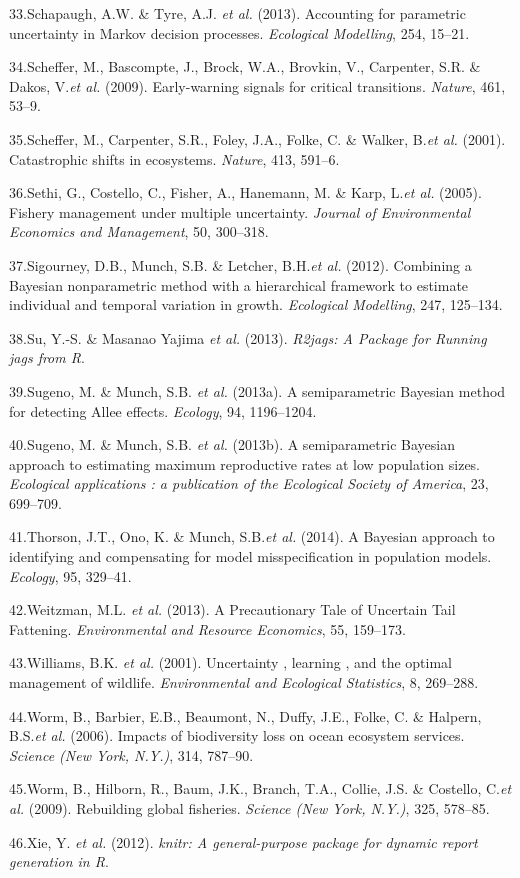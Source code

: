 \documentclass[author-year, 12pt,review]{elsarticle} %
\begin{document}
33.Schapaugh, A.W. \& Tyre, A.J. \emph{et al.} (2013). Accounting for
parametric uncertainty in Markov decision processes. \emph{Ecological
Modelling}, 254, 15--21.

34.Scheffer, M., Bascompte, J., Brock, W.A., Brovkin, V., Carpenter,
S.R. \& Dakos, V.\emph{et al.} (2009). Early-warning signals for
critical transitions. \emph{Nature}, 461, 53--9.

35.Scheffer, M., Carpenter, S.R., Foley, J.A., Folke, C. \& Walker,
B.\emph{et al.} (2001). Catastrophic shifts in ecosystems.
\emph{Nature}, 413, 591--6.

36.Sethi, G., Costello, C., Fisher, A., Hanemann, M. \& Karp, L.\emph{et
al.} (2005). Fishery management under multiple uncertainty.
\emph{Journal of Environmental Economics and Management}, 50, 300--318.

37.Sigourney, D.B., Munch, S.B. \& Letcher, B.H.\emph{et al.} (2012).
Combining a Bayesian nonparametric method with a hierarchical framework
to estimate individual and temporal variation in growth.
\emph{Ecological Modelling}, 247, 125--134.

38.Su, Y.-S. \& Masanao Yajima \emph{et al.} (2013). \emph{R2jags: A
Package for Running jags from R}.

39.Sugeno, M. \& Munch, S.B. \emph{et al.} (2013a). A semiparametric
Bayesian method for detecting Allee effects. \emph{Ecology}, 94,
1196--1204.

40.Sugeno, M. \& Munch, S.B. \emph{et al.} (2013b). A semiparametric
Bayesian approach to estimating maximum reproductive rates at low
population sizes. \emph{Ecological applications : a publication of the
Ecological Society of America}, 23, 699--709.

41.Thorson, J.T., Ono, K. \& Munch, S.B.\emph{et al.} (2014). A Bayesian
approach to identifying and compensating for model misspecification in
population models. \emph{Ecology}, 95, 329--41.

42.Weitzman, M.L. \emph{et al.} (2013). A Precautionary Tale of
Uncertain Tail Fattening. \emph{Environmental and Resource Economics},
55, 159--173.

43.Williams, B.K. \emph{et al.} (2001). Uncertainty , learning , and the
optimal management of wildlife. \emph{Environmental and Ecological
Statistics}, 8, 269--288.

44.Worm, B., Barbier, E.B., Beaumont, N., Duffy, J.E., Folke, C. \&
Halpern, B.S.\emph{et al.} (2006). Impacts of biodiversity loss on ocean
ecosystem services. \emph{Science (New York, N.Y.)}, 314, 787--90.

45.Worm, B., Hilborn, R., Baum, J.K., Branch, T.A., Collie, J.S. \&
Costello, C.\emph{et al.} (2009). Rebuilding global fisheries.
\emph{Science (New York, N.Y.)}, 325, 578--85.

46.Xie, Y. \emph{et al.} (2012). \emph{knitr: A general-purpose package
for dynamic report generation in R}.
\end{document}
